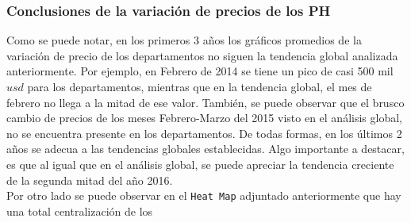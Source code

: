 \documentclass[a4paper, 10pt]{article}
\def\code#1{\texttt{#1}}
\newcommand\tab[1][0.5cm]{\hspace*{#1}}
\begin{document}
  \subsubsection{Conclusiones de la variación de precios de los PH}

    \tab Como se puede notar, en los primeros 3 años los gráficos promedios de la variación de precio de los departamentos no siguen la tendencia global analizada anteriormente. Por ejemplo, en Febrero de 2014 se tiene un pico de casi 500 mil $usd$ para los departamentos, mientras que en la tendencia global, el mes de febrero no llega a la mitad de ese valor. También, se puede observar que el brusco cambio de precios de los meses Febrero-Marzo del 2015 visto en el análisis global, no se encuentra presente en los departamentos. De todas formas, en los últimos 2 años se adecua a las tendencias globales establecidas. Algo importante a destacar, es que al igual que en el análisis global, se puede apreciar la tendencia creciente de la segunda mitad del año 2016.
    \\
    \tab Por otro lado se puede observar en el \code{Heat Map} adjuntado anteriormente que hay una total centralización de los
\end{document}

